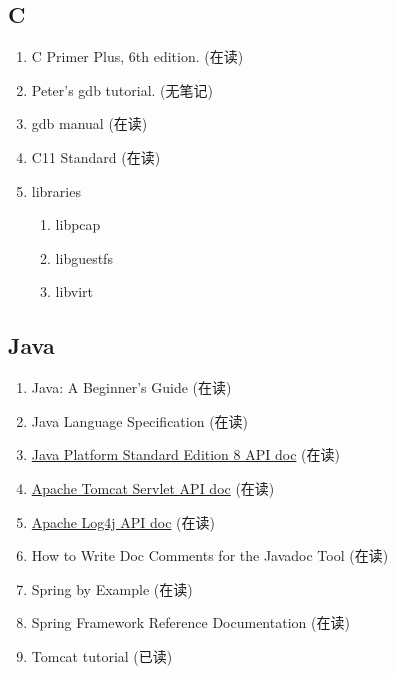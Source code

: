 \documentclass{article}
\begin{document}
\subsection{C}
\begin{enumerate}
    \item C Primer Plus, 6th edition. (在读)
    \item Peter's gdb tutorial. (无笔记)
    \item gdb manual (在读)
    \item C11 Standard (在读)
    \item libraries
        \begin{enumerate}
            \item libpcap
            \item libguestfs
            \item libvirt
        \end{enumerate}
\end{enumerate}
\subsection{Java}
\begin{enumerate}
    \item Java: A Beginner's Guide (在读)
    \item Java Language Specification (在读)
    \item \href{http://docs.oracle.com/javase/8/docs/api/index.html?overview-summary.html}{Java Platform Standard Edition 8 API doc} (在读)
    \item \href{http://tomcat.apache.org/tomcat-8.0-doc/servletapi/}{Apache Tomcat Servlet API doc} (在读)
    \item \href{http://logging.apache.org/log4j/2.x/log4j-api/apidocs/index.html}{Apache Log4j API doc} (在读)
    \item How to Write Doc Comments for the Javadoc Tool (在读)
    \item Spring by Example (在读)
    \item Spring Framework Reference Documentation (在读)
    \item Tomcat tutorial (已读)
\end{enumerate}
\end{document}
